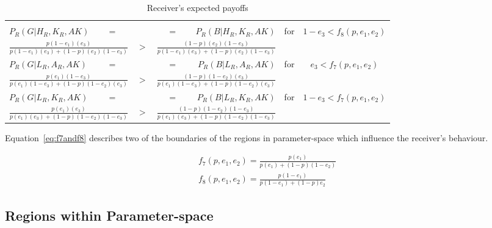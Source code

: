 \documentclass[a4paper,12pt]{article}
\numberwithin{equation}{section}
\begin{document}
\begin{table}[h]
\begin{center}
\begin{tabular}{lcccccrcc}
\vspace{1mm}\\
$P_{R}(G|H_{R},K_{R},AK)$ & $=$ & & & & $=$ & $P_{R}(B|H_{R},K_{R},AK)$ & \multirow{2}{*}{for} & \multirow{2}{*}{$1-e_{3}<f_{8}(p,e_{1},e_{2})$}
\vspace{-1mm}\\
\multicolumn{3}{r}{$\frac{p(1-e_{1})(e_{3})}{p(1-e_{1})(e_{3})+(1-p)(e_{2})(1-e_{3})}$} & $>$ & \multicolumn{3}{l}{$\frac{(1-p)(e_{2})(1-e_{3})}{p(1-e_{1})(e_{3})+(1-p)(e_{2})(1-e_{3})}$} &
\vspace{1mm}\\
$P_{R}(G|L_{R},A_{R},AK)$ & $=$ & & & & $=$ & $P_{R}(B|L_{R},A_{R},AK)$ & \multirow{2}{*}{for} & \multirow{2}{*}{$e_{3}<f_{7}(p,e_{1},e_{2})$}
\vspace{-1mm}\\
\multicolumn{3}{r}{$\frac{p(e_{1})(1-e_{3})}{p(e_{1})(1-e_{3})+(1-p)(1-e_{2})(e_{3})}$} & $>$ & \multicolumn{3}{l}{$\frac{(1-p)(1-e_{2})(e_{3})}{p(e_{1})(1-e_{3})+(1-p)(1-e_{2})(e_{3})}$} &
\vspace{1mm}\\
$P_{R}(G|L_{R},K_{R},AK)$ & $=$ & & & & $=$ & $P_{R}(B|L_{R},K_{R},AK)$ & \multirow{2}{*}{for} & \multirow{2}{*}{$1-e_{3}<f_{7}(p,e_{1},e_{2})$}
\vspace{-1mm}\\
\multicolumn{3}{r}{$\frac{p(e_{1})(e_{3})}{p(e_{1})(e_{3})+(1-p)(1-e_{2})(1-e_{3})}$} & $>$ & \multicolumn{3}{l}{$\frac{(1-p)(1-e_{2})(1-e_{3})}{p(e_{1})(e_{3})+(1-p)(1-e_{2})(1-e_{3})}$} &
\end{tabular}
\end{center}
\caption{Receiver's expected payoffs}
\label{tab:CueGamewithObservableAmplification/ConditionalPayoffsR}
\end{table}

Equation~\ref{eq:f7andf8} describes two of the boundaries of the regions in parameter-space which influence the receiver's behaviour.

\begin{subequations}
\label{eq:f7andf8}
\begin{gather}
f_{7}(p,e_{1},e_{2})=\frac{p(e_{1})}{p(e_{1})+(1-p)(1-e_{2})}\\
f_{8}(p,e_{1},e_{2})=\frac{p(1-e_{1})}{p(1-e_{1})+(1-p)e_{2}}
\end{gather}
\end{subequations}

\newpage

\subsection{Regions within Parameter-space}
\label{sec:Cue Game with Observable Amplification/Regions}
\end{document}
